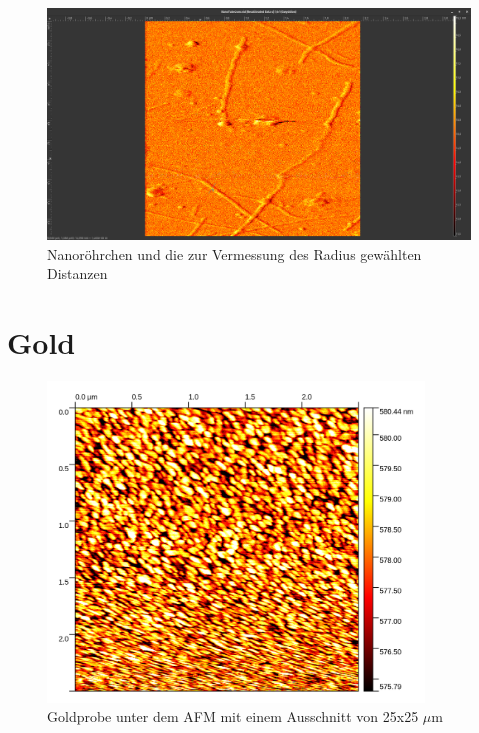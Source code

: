 \begin{figure}[h]
    \centering
    \includegraphics[width = \linewidth]{Bilder/Nanotubes/NanotubesBreiteHoehe2.png}
    \caption{Nanoröhrchen und die zur Vermessung des Radius gewählten Distanzen}
    \label{NanoRadius}
\end{figure}


\clearpage
\section{Gold}

\begin{figure}[h]
    \centering
    \includegraphics[width = 10cm]{Bilder/Gold/Gold25um.png}
    \caption{Goldprobe unter dem AFM mit einem Ausschnitt von 25x25 $\mu$m}
    \label{Gold1}
\end{figure}



